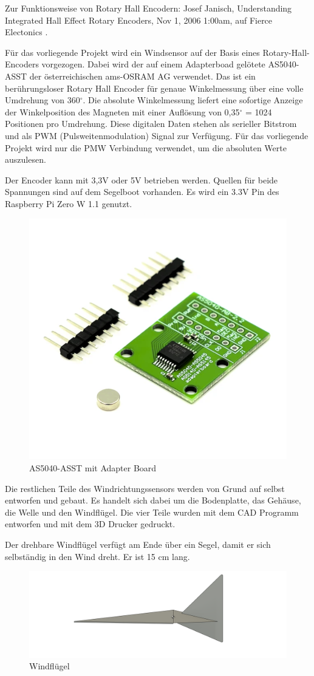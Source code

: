 Zur Funktionsweise von Rotary Hall Encodern: Josef Janisch, Understanding Integrated Hall Effect Rotary Encoders, Nov 1, 2006 1:00am, auf Fierce Electonics \cite{janisch_understanding_2006}.

Für das vorliegende Projekt wird ein Windsensor auf der Basis eines Rotary-Hall-Encoders vorgezogen. Dabei wird der auf einem Adapterboad gelötete AS5040-ASST der österreichischen ams-OSRAM AG verwendet. Das ist ein berührungsloser Rotary Hall Encoder für genaue Winkelmessung über eine volle Umdrehung von 360$^\circ$.  Die absolute Winkelmessung liefert eine sofortige Anzeige der Winkelposition des Magneten mit einer Auflösung von 0,35$^\circ$ = 1024 Positionen pro Umdrehung. Diese digitalen Daten stehen als serieller Bitstrom und als PWM (Pulsweitenmodulation) Signal zur Verfügung. Für das vorliegende Projekt wird nur die PMW Verbindung verwendet, um die absoluten Werte auszulesen.

Der Encoder kann mit 3,3V oder 5V betrieben werden. Quellen für beide Spannungen sind auf dem Segelboot vorhanden. Es wird ein 3.3V Pin des Raspberry Pi Zero W 1.1 genutzt.

\begin{figure}
    \centering
    \includegraphics[width=0.5\linewidth]{assets/as5040image.png}
    \caption{AS5040-ASST mit Adapter Board}
    \label{fig:as5040}
\end{figure}
Die restlichen Teile des Windrichtungssensors werden von Grund auf selbst entworfen und gebaut. Es handelt sich dabei um die Bodenplatte, das Gehäuse, die Welle und den Windflügel. Die vier Teile wurden mit dem CAD Programm entworfen und mit dem 3D Drucker gedruckt.

Der drehbare Windflügel verfügt am Ende über ein Segel, damit er sich selbständig in den Wind dreht. Er ist 15 cm lang.
\begin{figure}[H]
    \centering
    \includegraphics[width=0.75\linewidth]{assets/windsensor_top.png}
    \caption{Windflügel}
    
\end{figure}


